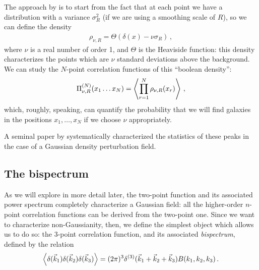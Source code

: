 \documentclass[main.tex]{subfiles}
\begin{document}
The approach by \textcite[]{matarresePathintegralApproachLargescale1986} is to start from the fact that at each point we have a distribution with a variance \(\sigma_R^2\) (if we are using a smoothing scale of \(R\)), so we can define the density 
%
\begin{align}
\rho_{\nu , R} = \Theta (\delta (x) - \nu \sigma _R)
\,,
\end{align}
%
where \(\nu \) is a real number of order 1, and \(\Theta \) is the Heaviside function: this density characterizes the points which are \(\nu \) standard deviations above the background. 
We can study the \(N\)-point correlation functions of this ``boolean density'': 
%
\begin{align}
\Pi^{(N)}_{\nu , R} (x_1 \dots x_N) = \expval{ \prod_{r=1}^{N} \rho _{\nu , R} (x_r)}
\,,
\end{align}
%
which, roughly, speaking, can quantify the probability that we will find galaxies in the positions \(x_1, \dots, x_N\) if we choose \(\nu \) appropriately. 

A seminal paper by \textcite[]{bardeenStatisticsPeaksGaussian1986} systematically characterized the statistics of these peaks in the case of a Gaussian density perturbation field.


\subsection{The bispectrum}

As we will explore in more detail later, the two-point function and its associated power spectrum completely characterize a Gaussian field: all the higher-order \(n\)-point correlation functions can be derived from the two-point one.
Since we want to characterize non-Gaussianity, then, we define the simplest object which allows us to do so: the 3-point correlation function, and its associated \emph{bispectrum}, defined by the relation 
%
\begin{align}
\expval{ \delta (\vec{k}_1 ) \delta (\vec{k}_2 ) \delta (\vec{k}_3 ) }
= (2 \pi )^3 \delta^{(3)} (\vec{k}_1 + \vec{k}_2 + \vec{k}_3 ) B (k_1, k_2, k_3)
\,.
\end{align}
\end{document}
